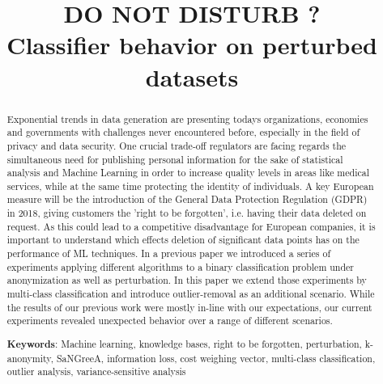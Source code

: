 \documentclass{llncs}
\begin{document}
\title{DO NOT DISTURB ? \\ Classifier behavior on perturbed datasets}


	
\maketitle

\begin{abstract}

Exponential trends in data generation are presenting todays organizations, economies and governments with challenges never encountered before, especially in the field of privacy and data security. One crucial trade-off regulators are facing regards the simultaneous need for publishing personal information for the sake of statistical analysis and Machine Learning in order to increase quality levels in areas like medical services, while at the same time protecting the identity of individuals. A key European measure will be the introduction of the General Data Protection Regulation (GDPR) in 2018, giving customers the 'right to be forgotten', i.e. having their data deleted on request. As this could lead to a competitive disadvantage for European companies, it is important to understand which effects deletion of significant data points has on the performance of ML techniques. In a previous paper we introduced a series of experiments applying different algorithms to a binary classification problem under anonymization as well as perturbation. In this paper we extend those experiments by multi-class classification and introduce outlier-removal as an additional scenario. While the results of our previous work were mostly in-line with our expectations, our current experiments revealed unexpected behavior over a range of different scenarios.


\medskip

\textbf{Keywords}: Machine learning, knowledge bases, right to be forgotten, perturbation, k-anonymity, SaNGreeA, information loss, cost weighing vector, multi-class classification, outlier analysis, variance-sensitive analysis


\end{abstract}
\end{document}
